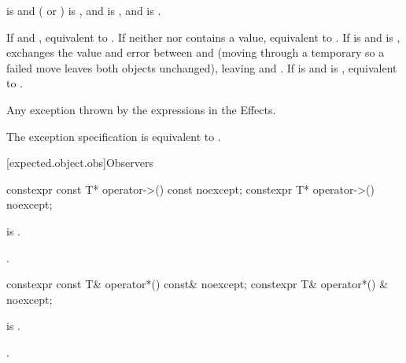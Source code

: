 \begin{itemdescr}
\pnum
\constraints
{} is  and ( or ) is , and  is , and  is .

\pnum
\effects
If  and , equivalent to . If neither  nor  contains a value, equivalent to . If  is  and  is , exchanges the value and error between  and  (moving through a temporary so a failed move leaves both objects unchanged), leaving   and  . If  is  and  is , equivalent to .

\pnum
\throws
Any exception thrown by the expressions in the Effects.

\pnum
\remarks
The exception specification is equivalent to .
\end{itemdescr}

[expected.object.obs]{Observers}

%
\begin{itemdecl}
constexpr const T* operator->() const noexcept;
constexpr T* operator->() noexcept;
\end{itemdecl}

\begin{itemdescr}
\pnum
\hardexpects
{} is .

\pnum
\returns
{}.
\end{itemdescr}

%
\begin{itemdecl}
constexpr const T& operator*() const& noexcept;
constexpr T& operator*() & noexcept;
\end{itemdecl}

\begin{itemdescr}
\pnum
\hardexpects
{} is .

\pnum
\returns
{}.
\end{itemdescr}


